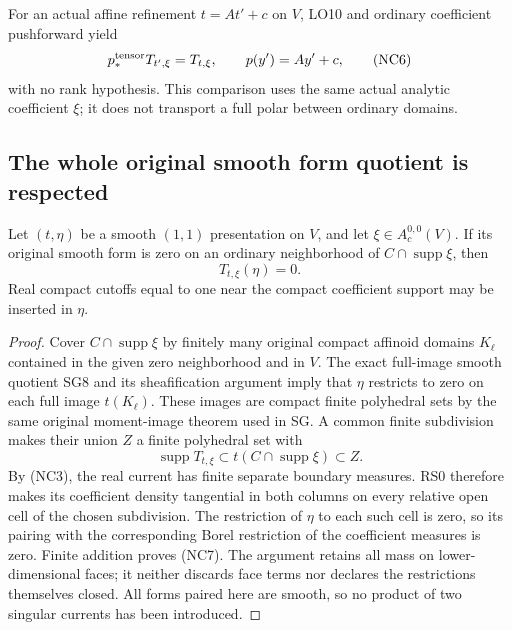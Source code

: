 For an actual affine refinement \(t=At'+c\) on \(V\), LO10 and
ordinary coefficient pushforward yield
\[
                        p_*^{\rm tensor}T_{t',\xi}=T_{t,\xi},
             \qquad p(y')=Ay'+c,
 \tag{NC6}
\]
with no rank hypothesis.  This comparison uses the same actual
analytic coefficient \(\xi\); it does not transport a full polar
between ordinary domains.

\subsection{The whole original smooth form quotient is respected}

\begin{lemma}
Let \((t,\eta)\) be a smooth \((1,1)\) presentation on \(V\),
and let \(\xi\in A_c^{0,0}(V)\).  If its original smooth form
is zero on an ordinary neighborhood of
\(C\cap\operatorname{supp}\xi\), then
\[
                         T_{t,\xi}(\eta)=0.
 \tag{NC7}
\]
Real compact cutoffs equal to one near the compact coefficient
support may be inserted in \(\eta\).
\end{lemma}

\begin{proof}
Cover \(C\cap\operatorname{supp}\xi\) by finitely many original
compact affinoid domains \(K_\ell\) contained in the given zero
neighborhood and in \(V\).  The exact full-image smooth quotient
SG8 and its sheafification argument imply that \(\eta\) restricts
to zero on each full image \(t(K_\ell)\).  These images are compact
finite polyhedral sets by the same original moment-image theorem
used in SG.  A common finite subdivision makes their union
\(Z\) a finite polyhedral set with
\[
            \operatorname{supp}T_{t,\xi}
                      \subset t(C\cap\operatorname{supp}\xi)\subset Z.
\]
By (NC3), the real current has finite separate boundary measures.
RS0 therefore makes its coefficient density tangential in both
columns on every relative open cell of the chosen subdivision.
The restriction of \(\eta\) to each such cell is zero, so its
pairing with the corresponding Borel restriction of the coefficient
measures is zero.  Finite addition proves (NC7).  The argument retains
all mass on lower-dimensional faces; it neither discards face terms
nor declares the restrictions themselves closed.  All forms paired
here are smooth, so no product of two singular currents has been
introduced.
\end{proof}

